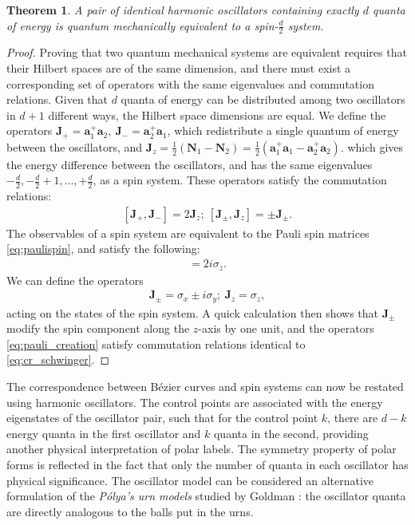 \documentclass[12pt,final,3p]{elsarticle}
\newtheorem{theorem}{Theorem}
\begin{document}
\begin{theorem}
	A pair of identical harmonic oscillators containing exactly $d$ quanta of energy is quantum mechanically equivalent to a spin-$\frac{d}{2}$ system.
\end{theorem}
\begin{proof}
	Proving that two quantum mechanical systems are equivalent requires that their Hilbert spaces are of the same dimension, and there must exist a corresponding set of operators with the same eigenvalues and commutation relations.
	Given that $d$ quanta of energy can be distributed among two oscillators in $d+1$ different ways, the Hilbert space dimensions are equal. We define the operators $\mathbf{J}_{+} = \mathbf{a}_{1}^{+}\mathbf{a}_{2},\ \mathbf{J}_{-} = \mathbf{a}_{2}^{+}\mathbf{a}_{1}$, which redistribute a single quantum of energy between the oscillators, and $\mathbf{J}_{z} = \frac{1}{2}(\mathbf{N}_{1} - \mathbf{N}_{2}) =  \frac{1}{2}(\mathbf{a}_{1}^{+}\mathbf{a}_{1} - \mathbf{a}_{2}^{+}\mathbf{a}_{2})$. which gives the energy difference between the oscillators, and has the same eigenvalues $-\frac{d}{2}, -\frac{d}{2}+1, \ldots, +\frac{d}{2}$, as a spin system. These operators satisfy the commutation relations:
	\begin{align}\label{eq:cr_schwinger}
	[\mathbf{J}_{+},\mathbf{J}_{-}] = 2\mathbf{J}_{z};\ 
	[\mathbf{J}_{\pm},\mathbf{J}_{z} ] = \pm \mathbf{J}_{\pm}.
	\end{align} 
	The observables of a spin system are equivalent to the Pauli spin matrices \eqref{eq:paulispin}, and satisfy the following:
	\begin{align}
	[\sigma_{x}, \sigma_{y}] = 2i\sigma_{z}.
	\end{align}
	We can define the operators 
	\begin{align}\label{eq:pauli_creation}
	\mathbf{J}_{\pm} = \sigma_{x} \pm i \sigma_{y};\ \mathbf{J}_{z} = \sigma_{z},
	\end{align}
	acting on the states of the spin system. A quick calculation then shows that $\mathbf{J}_{\pm}$ modify the spin component along the $z$-axis by one unit, and the operators \eqref{eq:pauli_creation} satisfy commutation relations identical to \eqref{eq:cr_schwinger}.
\end{proof}

The correspondence between B\'{e}zier curves and spin systems can now be restated using harmonic oscillators. The control points are associated with the energy eigenstates of the oscillator pair, such that for the control point $k$, there are $d-k$ energy quanta in the first oscillator and $k$ quanta in the second, providing another physical interpretation of polar labels. The symmetry property of polar forms is reflected in the fact that only the number of quanta in each oscillator has physical significance. The oscillator model can be considered an alternative formulation of the \emph{P\'{o}lya's urn models} studied by Goldman \cite{goldman1985polya}: the oscillator quanta are directly analogous to the balls put in the urns.
\end{document}
